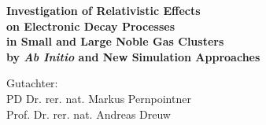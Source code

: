 \thispagestyle{empty}

\vspace*{2cm}

\begin{center}
 \Large
 \textbf{Investigation of Relativistic Effects\\[1ex]
         on Electronic Decay Processes\\[1ex]
         in %
         Small and Large Noble Gas Clusters\\[1ex]
         by \emph{Ab Initio} and New Simulation Approaches}


\vfill
\end{center}

\large
Gutachter:\\[2ex]
PD Dr. rer. nat. Markus Pernpointner\\
Prof. Dr. rer. nat. Andreas Dreuw

\normalsize
\cleardoublepage
